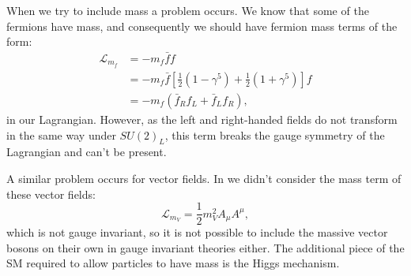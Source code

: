 When we try to include mass a problem occurs. We know that some of the fermions have mass, and consequently we should have fermion mass terms of the form:
\begin{equation}
  \begin{split}
    \mathcal{L}_{m_{f}}&=-m_{f}\bar{f}{f} \\
    &=-m_{f}\bar{f}\left[\frac{1}{2}\left(1-\gamma^{5}\right)+\frac{1}{2}\left(1+\gamma^{5}\right)\right]f \\
    &=-m_{f}\left(\bar{f}_{R}f_{L}+\bar{f}_{L}f_{R}\right),
  \end{split}
\end{equation}
in our Lagrangian. However, as the left and right-handed fields do not transform in the same way under $SU\!\left(2\right)_{L}$, this term breaks the gauge symmetry of the Lagrangian and can't be present. 

A similar problem occurs for vector fields. In  we didn't consider the mass term of these vector fields:
\begin{equation}
  \label{eq:vectorlagrangian}
  \mathcal{L}_{m_V}=\frac{1}{2}m_{V}^{2}A_{\mu}A^{\mu},
\end{equation}
which is not gauge invariant, so it is not possible to include the massive vector bosons on their own in gauge invariant theories either. The additional piece of the SM required to allow particles to have mass is the Higgs mechanism.

